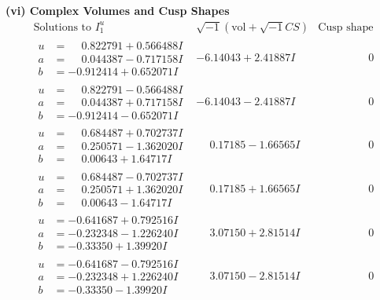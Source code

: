 \documentclass[1p]{elsarticle_modified}
\theoremstyle{definition}
\newcommand{\I}{\sqrt{-1}}
\begin{document}
\newpage\flushleft \textbf{(vi) Complex Volumes and Cusp Shapes}
$$\begin{array}{c|c|c}  
\text{Solutions to }I^u_{1}& \I (\text{vol} + \sqrt{-1}CS) & \text{Cusp shape}\\
 \hline 
\begin{aligned}
u &= \phantom{-}0.822791 + 0.566488 I \\
a &= \phantom{-}0.044387 - 0.717158 I \\
b &= -0.912414 + 0.652071 I\end{aligned}
 & -6.14043 + 2.41887 I & \phantom{-0.000000 } 0 \\ \hline\begin{aligned}
u &= \phantom{-}0.822791 - 0.566488 I \\
a &= \phantom{-}0.044387 + 0.717158 I \\
b &= -0.912414 - 0.652071 I\end{aligned}
 & -6.14043 - 2.41887 I & \phantom{-0.000000 } 0 \\ \hline\begin{aligned}
u &= \phantom{-}0.684487 + 0.702737 I \\
a &= \phantom{-}0.250571 - 1.362020 I \\
b &= \phantom{-}0.00643 + 1.64717 I\end{aligned}
 & \phantom{-}0.17185 - 1.66565 I & \phantom{-0.000000 } 0 \\ \hline\begin{aligned}
u &= \phantom{-}0.684487 - 0.702737 I \\
a &= \phantom{-}0.250571 + 1.362020 I \\
b &= \phantom{-}0.00643 - 1.64717 I\end{aligned}
 & \phantom{-}0.17185 + 1.66565 I & \phantom{-0.000000 } 0 \\ \hline\begin{aligned}
u &= -0.641687 + 0.792516 I \\
a &= -0.232348 - 1.226240 I \\
b &= -0.33350 + 1.39920 I\end{aligned}
 & \phantom{-}3.07150 + 2.81514 I & \phantom{-0.000000 } 0 \\ \hline\begin{aligned}
u &= -0.641687 - 0.792516 I \\
a &= -0.232348 + 1.226240 I \\
b &= -0.33350 - 1.39920 I\end{aligned}
 & \phantom{-}3.07150 - 2.81514 I & \phantom{-0.000000 } 0 \\ \hline\begin{aligned}

\end{aligned}
\end{array}$$
\end{document}
